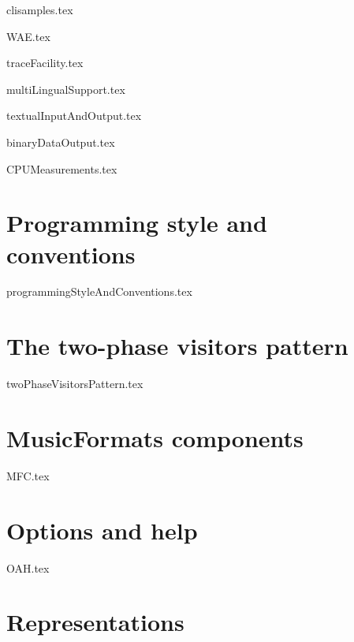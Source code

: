 \documentclass[11pt,a4paper]{report}
\begin{document}
{clisamples.tex}

{WAE.tex}

{traceFacility.tex}

{multiLingualSupport.tex}

{textualInputAndOutput.tex}

{binaryDataOutput.tex}

{CPUMeasurements.tex}


\part{Programming style and conventions}

{programmingStyleAndConventions.tex}


\part{The two-phase visitors pattern}

{twoPhaseVisitorsPattern.tex}


\part{MusicFormats components}

{MFC.tex}


\part{Options and help}

{OAH.tex}


\part{Representations}
\end{document}
